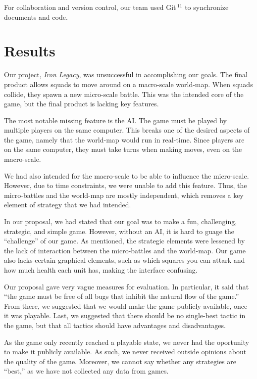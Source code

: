 \documentclass{article}
\begin{document}
For collaboration and version control, our team used Git$\,^{11}$ to
synchronize documents and code.

\section*{Results}

Our project, \emph{Iron Legacy}, was unsuccessful in accomplishing
    our goals.
    The final product allows squads to move around on a macro-scale world-map.
    When squads collide, they spawn a new micro-scale battle.
    This was the intended core of the game, but the final product is lacking
    key features.

The most notable missing feature is the AI.
    The game must be played by multiple players on the same computer.
    This breaks one of the desired aspects of the game,
    namely that the world-map would run in real-time.
    Since players are on the same computer, they must take turns when making
    moves, even on the macro-scale.

We had also intended for the macro-scale to be able to influence the
    micro-scale.
    However, due to time constraints, we were unable to add this feature.
    Thus, the micro-battles and the world-map are mostly independent,
    which removes a key element of strategy that we had intended.

In our proposal, we had stated that our goal was to make a fun, challenging,
    strategic, and simple game.
    However, without an AI, it is hard to guage the ``challenge'' of our game.
    As mentioned, the strategic elements were lessened by the lack of
    interaction between the micro-battles and the world-map.
    Our game also lacks certain graphical elements, such as which squares
    you can attark and how much health each unit has, making the interface
    confusing.

Our proposal gave very vague measures for evaluation.
    In particular, it said that ``the game must be free of all bugs that
    inhibit the natural flow of the game.''
    From there, we suggested that we would make the game publicly available,
    once it was playable.
    Last, we suggested that there should be no single-best tactic in the game,
    but that all tactics should have advantages and disadvantages.

As the game only recently reached a playable state,
    we never had the oportunity to make it publicly available.
    As such, we never received outside opinions about the quality of the game.
    Moreover, we cannot say whether any strategies are ``best,''
    as we have not collected any data from games.
\end{document}
